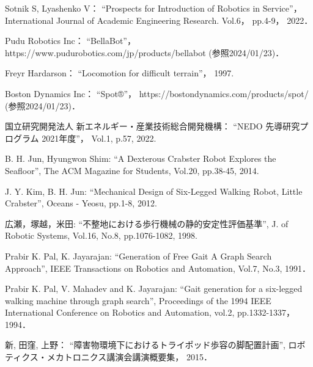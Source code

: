 ﻿\begin{thebibliography}{99}
    Sotnik S, Lyashenko V：
    ``Prospects for Introduction of Robotics in Service''，
    International Journal of Academic Engineering Research.
    Vol.6，
    pp.4-9， %
    2022．

    Pudu Robotics Inc：
    ``BellaBot''，
    https://www.pudurobotics.com/jp/products/bellabot (参照2024/01/23)．

    Freyr Hardarson：
    ``Locomotion for difficult terrain''，
    1997.

    Boston Dynamics Inc：
    ``Spot®''，
    https://bostondynamics.com/products/spot/ (参照2024/01/23)．

    国立研究開発法人 新エネルギー・産業技術総合開発機構：
    ``NEDO 先導研究プログラム 2021年度''，
    Vol.1,
    p.57, 
    2022. 

    B. H. Jun, Hyungwon Shim:
    ``A Dexterous Crabster Robot Explores the Seafloor'',
    The ACM Magazine for Students,
    Vol.20,
    pp.38-45, %
    2014.

    J. Y. Kim, B. H. Jun:
    ``Mechanical Design of Six-Legged Walking Robot, Little Crabster'',
    Oceans - Yeosu, %
    pp.1-8, %
    2012.

    広瀬，塚越，米田: 
    ``不整地における歩行機械の静的安定性評価基準'', 
    J. of Robotic Systems,
    Vol.16, No.8, 
    pp.1076-1082, %
    1998.

    Prabir K. Pal, K. Jayarajan: 
    ``Generation of Free Gait A Graph Search Approach'',
    IEEE Transactions on Robotics and Automation,
    Vol.7, No.3,
    1991．

    Prabir K. Pal, V. Mahadev and K. Jayarajan:
    ``Gait generation for a six-legged walking machine through graph search'',
    Proceedings of the 1994 IEEE International Conference on Robotics and Automation,
    vol.2,
    pp.1332-1337，%
    1994．

    新, 田窪, 上野：
    ``障害物環境下におけるトライポッド歩容の脚配置計画'',
    ロボティクス・メカトロニクス講演会講演概要集，
    2015．


\end{thebibliography}
